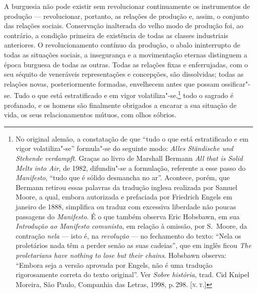 
A burguesia não pode existir sem revolucionar continuamente os
instrumentos de produção  ---  revolucionar, portanto, as relações de
produção e, assim, o conjunto das relações sociais. Conservação
inalterada do velho modo de produção foi, ao contrário, a condição
primeira de existência de todas as classes industriais anteriores. O
revolucionamento contínuo da produção, o abalo ininterrupto de todas as
situações sociais, a insegurança e a movimentação eternas distinguem a
época burguesa de todas as outras. Todas as relações fixas e
enferrujadas, com o seu séquito de veneráveis representações e
concepções, são dissolvidas; todas as relações novas, posteriormente
formadas, envelhecem antes que possam ossificar"-se. Tudo o que está
estratificado e em vigor
volatiliza"-se,\footnote{ No original alemão, a constatação de que      \label{2}
``tudo o que está estratificado e em vigor volatiliza"-se'' formula"-se		
do seguinte modo: \textit{Alles Ständische und Stehende verdampft}.
Graças ao livro de Marshall Bermann \textit{All that is Solid
Melts into Air}, de 1982, difundiu"-se a formulação, referente a esse passo do
\textit{Manifesto}, ``tudo que é sólido desmancha no ar''. Acontece,
porém, que Bermann retirou essas palavras da tradução inglesa realizada
por Samuel Moore, a qual, embora autorizada e prefaciada por
Friedrich Engels em janeiro de 1888, simplifica ou traduz com excessiva
liberdade não poucas passagens do \textit{Manifesto}. É o que
também observa Eric Hobsbawn, em sua \textit{Introdução ao Manifesto
comunista}, em relação à omissão, por S.~Moore, da contração \textit{nela}  --- 
isto é, na \textit{revolução}  ---  no fechamento do texto: ``Nela os proletários
nada têm a perder senão as suas cadeias'', que em inglês ficou \textit{The
proletarians have nothing to lose but their chains}. Hobsbawn observa:
``Embora seja a versão aprovada por Engels, não é uma tradução
rigorosamente correta do texto original''. Ver \textit{Sobre história},
trad. Cid Knipel Moreira, São Paulo, Companhia das Letras, 1998,
p.\,298. [\textsc{n.\,t.}]} todo o sagrado é profanado, e os homens são finalmente
obrigados a encarar a sua situação de vida, os seus relacionamentos mútuos,
com olhos sóbrios.

